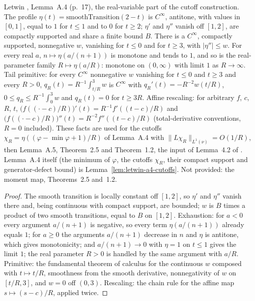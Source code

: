 \begin{lemma}
  \label{lem:letwin-cutoff-profile}
  \leanok
  Letwin \cite{Letwin2026QuadraticKLS}, Lemma~A.4 (p.~17), the real-variable part of the cutoff construction.  The
  profile $\eta(t)=\mathrm{smoothTransition}(2-t)$ is $C^\infty$, antitone, with values in $[0,1]$, equal to $1$ for
  $t\le1$ and to $0$ for $t\ge2$; $\eta'$ and $\eta''$ vanish off $[1,2]$, are compactly supported and share a finite
  bound $B$.  There is a $C^\infty$, compactly supported, nonnegative $w$, vanishing for $t\le0$ and for $t\ge3$, with
  $|\eta''|\le w$.  For every real $a$, $n\mapsto\eta(a/(n+1))$ is monotone and tends to $1$, and so is the real-parameter
  family $R\mapsto\eta(a/R)$: monotone on $(0,\infty)$ with limit $1$ as $R\to\infty$.  Tail primitive: for every
  $C^\infty$ nonnegative $w$ vanishing for $t\le0$ and $t\ge3$ and every $R>0$, $q_R(t)=R^{-1}\int_{t/R}^{3}w$ is
  $C^\infty$ with $q_R'(t)=-R^{-2}w(t/R)$, $0\le q_R\le R^{-1}\int_0^3w$ and $q_R(t)=0$ for $t\ge3R$.  Affine rescaling:
  for arbitrary $f$, $c$, $R$, $t$, $\big(f((\cdot-c)/R)\big)'(t)=R^{-1}f'((t-c)/R)$ and
  $\big(f((\cdot-c)/R)\big)''(t)=R^{-2}f''((t-c)/R)$ (total-derivative conventions, $R=0$ included).  These facts are used for the
  cutoffs $\chi_R=\eta((\varphi-\min\varphi+1)/R)$ of Lemma~A.4 with $\|L\chi_R\|_{L^1(\nu)}=O(1/R)$, then Lemma~A.5,
  Theorem~2.5 and Theorem~1.2, the input of Lemma~4.2 of \cite{BizeulKlartagLehec2026}.  Lemma~A.4 itself (the minimum of
  $\varphi$, the cutoffs $\chi_R$, their compact support and generator-defect bound) is Lemma~\ref{lem:letwin-a4-cutoffs}.
  Not provided: the moment map, Theorems~2.5 and~1.2.
\end{lemma}
\begin{proof}
  \leanok
  The smooth transition is locally constant off $[1,2]$, so $\eta'$ and $\eta''$ vanish there and, being continuous with
  compact support, are bounded; $w$ is $B$ times a product of two smooth transitions, equal to $B$ on $[1,2]$.
  Exhaustion: for $a<0$ every argument $a/(n+1)$ is negative, so every term $\eta(a/(n+1))$ already equals $1$;
  for $a\ge0$ the arguments $a/(n+1)$ decrease in $n$ and $\eta$ is antitone, which gives monotonicity; and
  $a/(n+1)\to0$ with $\eta=1$ on $t\le1$ gives the limit $1$; the real parameter $R>0$ is handled by the same argument
  with $a/R$.  Primitive: the fundamental theorem of calculus for the
  continuous $w$ composed with $t\mapsto t/R$, smoothness from the smooth derivative, nonnegativity of $w$ on $[t/R,3]$, and
  $w=0$ off $(0,3)$.  Rescaling: the chain rule for the affine map $s\mapsto(s-c)/R$, applied twice.
\end{proof}

